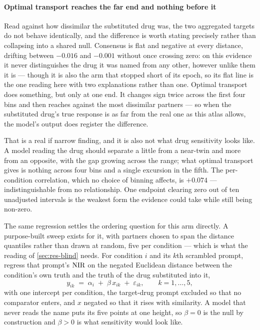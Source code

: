 \paragraph{Optimal transport reaches the far end and nothing before it} Read
against how dissimilar the substituted drug was, the two aggregated targets do
not behave identically, and the difference is worth stating precisely rather than
collapsing into a shared null. Consensus is flat and negative at every distance,
drifting between $-0.016$ and $-0.001$ without once crossing zero: on this evidence
it never distinguishes the drug it was named from any other, however unlike them
it is --- though it is also the arm that stopped short of its epoch, so its flat
line is the one reading here with two explanations rather than one. Optimal transport does something, but only at one end. It changes sign twice
across the first four bins and then reaches
 against the most dissimilar partners --- so when the
substituted drug's true response is as far from the real one as this atlas
allows, the model's output does register the difference.

That is a real if narrow finding, and it is also not what drug sensitivity looks
like. A model reading the drug should separate a little from a near-twin and more
from an opposite, with the gap growing across the range; what optimal transport
gives is nothing across four bins and a single excursion in the fifth. The
per-condition correlation, which no choice of binning affects, is $+0.074$ ---
indistinguishable from no relationship. One endpoint clearing zero out of ten
unadjusted intervals is the weakest form the evidence could take while still
being non-zero.

The same regression settles the ordering question for this arm directly. A
purpose-built sweep exists for it, with partners chosen to span the distance
quantiles rather than drawn at random, five per condition --- which is what the
reading of \cref{sec:res-blind} needs. For condition $i$ and its $k$th scrambled
prompt, regress that prompt's $\textrm{NIR}$ on the negated Euclidean distance between the
condition's own truth and the truth of the drug substituted into it,
\begin{equation}
 y_{ik} \;=\; \alpha_i \;+\; \beta\,x_{ik} \;+\; \varepsilon_{ik},
 \qquad k = 1,\dots,5,
\end{equation}
with one intercept per condition, the target-drug prompt excluded so that no
comparator enters, and $x$ negated so that it rises with similarity. A model that
never reads the name puts its five points at one height, so $\beta = 0$ is the null
by construction and $\beta > 0$ is what sensitivity would look like.


